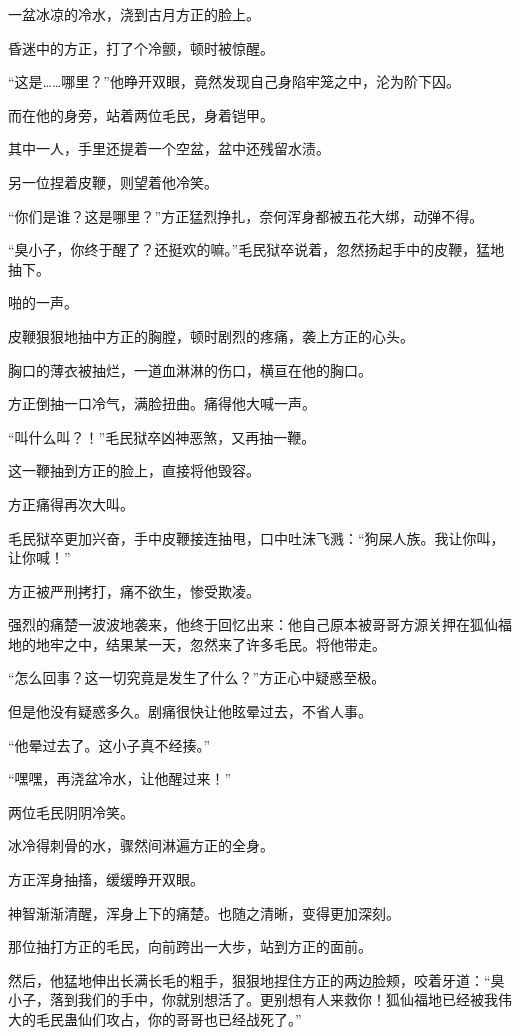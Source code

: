 \begin{this_body}
一盆冰凉的冷水，浇到古月方正的脸上。

昏迷中的方正，打了个冷颤，顿时被惊醒。

“这是……哪里？”他睁开双眼，竟然发现自己身陷牢笼之中，沦为阶下囚。

而在他的身旁，站着两位毛民，身着铠甲。

其中一人，手里还提着一个空盆，盆中还残留水渍。

另一位捏着皮鞭，则望着他冷笑。

“你们是谁？这是哪里？”方正猛烈挣扎，奈何浑身都被五花大绑，动弹不得。

“臭小子，你终于醒了？还挺欢的嘛。”毛民狱卒说着，忽然扬起手中的皮鞭，猛地抽下。

啪的一声。

皮鞭狠狠地抽中方正的胸膛，顿时剧烈的疼痛，袭上方正的心头。

胸口的薄衣被抽烂，一道血淋淋的伤口，横亘在他的胸口。

方正倒抽一口冷气，满脸扭曲。痛得他大喊一声。

“叫什么叫？！”毛民狱卒凶神恶煞，又再抽一鞭。

这一鞭抽到方正的脸上，直接将他毁容。

方正痛得再次大叫。

毛民狱卒更加兴奋，手中皮鞭接连抽甩，口中吐沫飞溅：“狗屎人族。我让你叫，让你喊！”

方正被严刑拷打，痛不欲生，惨受欺凌。

强烈的痛楚一波波地袭来，他终于回忆出来：他自己原本被哥哥方源关押在狐仙福地的地牢之中，结果某一天，忽然来了许多毛民。将他带走。

“怎么回事？这一切究竟是发生了什么？”方正心中疑惑至极。

但是他没有疑惑多久。剧痛很快让他眩晕过去，不省人事。

“他晕过去了。这小子真不经揍。”

“嘿嘿，再浇盆冷水，让他醒过来！”

两位毛民阴阴冷笑。

冰冷得刺骨的水，骤然间淋遍方正的全身。

方正浑身抽搐，缓缓睁开双眼。

神智渐渐清醒，浑身上下的痛楚。也随之清晰，变得更加深刻。

那位抽打方正的毛民，向前跨出一大步，站到方正的面前。

然后，他猛地伸出长满长毛的粗手，狠狠地捏住方正的两边脸颊，咬着牙道：“臭小子，落到我们的手中，你就别想活了。更别想有人来救你！狐仙福地已经被我伟大的毛民蛊仙们攻占，你的哥哥也已经战死了。”


\end{this_body}
